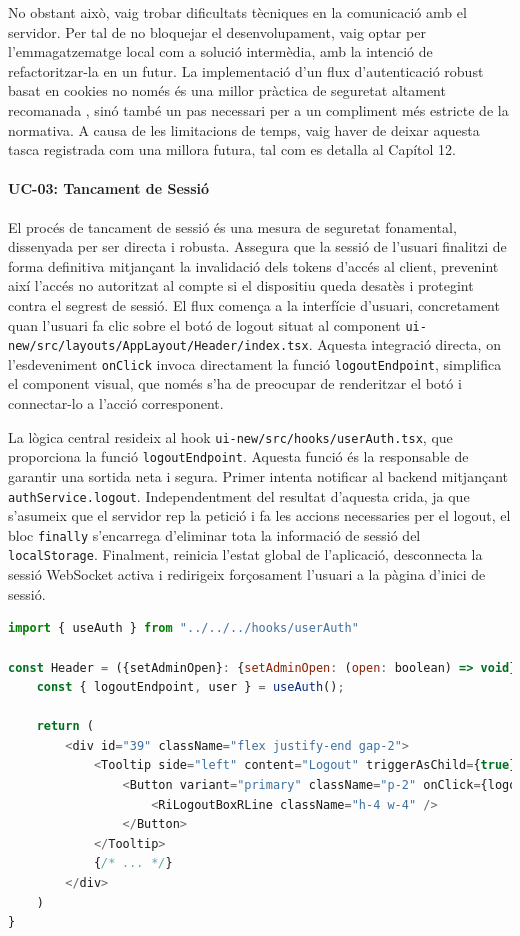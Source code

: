 No obstant això, vaig trobar dificultats tècniques en la comunicació amb el servidor. Per tal de no bloquejar el desenvolupament, vaig optar per l'emmagatzematge local com a solució intermèdia, amb la intenció de refactoritzar-la en un futur. La implementació d'un flux d'autenticació robust basat en cookies no només és una millor pràctica de seguretat altament recomanada \cite{auth0_token_best_practices}, sinó també un pas necessari per a un compliment més estricte de la normativa. A causa de les limitacions de temps, vaig haver de deixar aquesta tasca registrada com una millora futura, tal com es detalla al Capítol 12.

\paragraph{UC-03: Tancament de Sessió}
El procés de tancament de sessió és una mesura de seguretat fonamental, dissenyada per ser directa i robusta. Assegura que la sessió de l'usuari finalitzi de forma definitiva mitjançant la invalidació dels tokens d'accés al client, prevenint així l'accés no autoritzat al compte si el dispositiu queda desatès i protegint contra el segrest de sessió. El flux comença a la interfície d'usuari, concretament quan l'usuari fa clic sobre el botó de logout situat al component \texttt{ui-new/src/layouts/AppLayout/Header/index.tsx}. Aquesta integració directa, on l'esdeveniment \texttt{onClick} invoca directament la funció \texttt{logoutEndpoint}, simplifica el component visual, que només s'ha de preocupar de renderitzar el botó i connectar-lo a l'acció corresponent.

La lògica central resideix al hook \texttt{ui-new/src/hooks/userAuth.tsx}, que proporciona la funció \texttt{logoutEndpoint}. Aquesta funció és la responsable de garantir una sortida neta i segura. Primer intenta notificar al backend mitjançant \texttt{authService.logout}. Independentment del resultat d'aquesta crida, ja que s'asumeix que el servidor rep la petició i fa les accions necessaries per el logout, el bloc \texttt{finally} s'encarrega d'eliminar tota la informació de sessió del \texttt{localStorage}. Finalment, reinicia l'estat global de l'aplicació, desconnecta la sessió WebSocket activa i redirigeix forçosament l'usuari a la pàgina d'inici de sessió.

\begin{lstlisting}[language=javascript, caption={Fragment del component `Header` amb el botó de logout}]
import { useAuth } from "../../../hooks/userAuth"

const Header = ({setAdminOpen}: {setAdminOpen: (open: boolean) => void}) => {
    const { logoutEndpoint, user } = useAuth();

    return (
        <div id="39" className="flex justify-end gap-2">
            <Tooltip side="left" content="Logout" triggerAsChild={true}>
                <Button variant="primary" className="p-2" onClick={logoutEndpoint}>
                    <RiLogoutBoxRLine className="h-4 w-4" />
                </Button>
            </Tooltip>
            {/* ... */}
        </div>
    )
}
\end{lstlisting}

